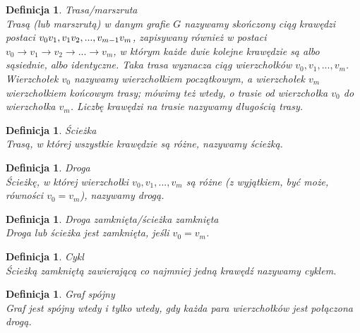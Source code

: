\documentclass[12pt,a4paper]{report}
\newtheorem{definition}[theorem]{Definicja}
\begin{document}
\begin{definition}{Trasa/marszruta \cite[Rozdział 3]{wilson2008}\\}
Trasą (lub marszrutą) w danym grafie $G$ nazywamy skończony ciąg krawędzi postaci $v_{0}v_{1}, v_{1}v_{2}, ..., \newline v_{m-1}v_{m}$, zapisywany również w postaci $v_{0} \rightarrow{} v_{1} \rightarrow{} v_{2} \rightarrow{} ... \rightarrow{} v_{m}$, w którym każde dwie kolejne krawędzie są albo sąsiednie, albo identyczne. Taka trasa wyznacza ciąg wierzchołków $v_{0}, v_{1}, ..., v_{m}$. Wierzchołek $v_{0}$ nazywamy wierzchołkiem początkowym, a wierzchołek $v_{m}$ wierzchołkiem końcowym trasy; mówimy też wtedy, o trasie od wierzchołka $v_{0}$ do wierzchołka $v_{m}$. Liczbę  krawędzi na trasie nazywamy długością trasy. \\
\end{definition}

\begin{definition}{Ścieżka \cite[Rozdział 3]{wilson2008}\\}
Trasą, w której wszystkie krawędzie są różne, nazywamy ścieżką.\\
\end{definition}

\begin{definition}{Droga \cite[Rozdział 3]{wilson2008}\\}
Ścieżkę, w której wierzchołki $v_{0}, v_{1}, ..., v_{m}$ są różne (z wyjątkiem, być może, równości $v_{0}=v_{m}$), nazywamy drogą. \\
\end{definition}

\begin{definition}{Droga zamknięta/ścieżka zamknięta \cite[Rozdział 3]{wilson2008}\\}
Droga lub ścieżka jest zamknięta, jeśli $v_{0}=v_{m}$.\\
\end{definition}

\begin{definition}{Cykl \cite[Rozdział 3]{wilson2008}\\}
Ścieżką zamkniętą zawierającą co najmniej jedną krawędź nazywamy cyklem. \\
\end{definition}

\begin{definition}{Graf spójny \cite[Rozdział 3]{wilson2008}\\}
Graf jest spójny wtedy i tylko wtedy, gdy każda para wierzchołków jest połączona drogą.\\
\end{definition}
\end{document}
